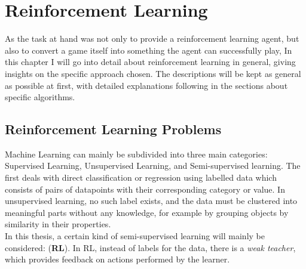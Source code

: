 \chapter{Reinforcement Learning}

\label{ch:RL} 

\newcommand{\inlinecode}[1]{\colorbox{evenmorelightgray}{\lstinline[basicstyle=\ttfamily\color{black}]{#1}}}

As the task at hand was not only to provide a reinforcement learning agent, but also to convert a game itself into something the agent can successfully play, In this chapter I will go into detail about reinforcement learning in general, giving insights on the specific approach chosen. The descriptions will be kept as general as possible at first, with detailed explanations following in the sections about specific algorithms.

\section{Reinforcement Learning Problems}

Machine Learning can mainly be subdivided into three main categories: Supervised Learning, Unsupervised Learning, and Semi-supervised learning. The first deals with direct classification or regression using labelled data which consists of pairs of datapoints with their corresponding category or value. In unsupervised learning, no such label exists, and the data must be clustered into meaningful parts without any knowledge, for example by grouping objects by similarity in their properties.\\
In this thesis, a certain kind of semi-supervised learning will mainly be considered:  (\textbf{RL}). In RL, instead of labels for the data, there is a \textit{weak teacher}, which provides feedback on actions performed by the learner.


